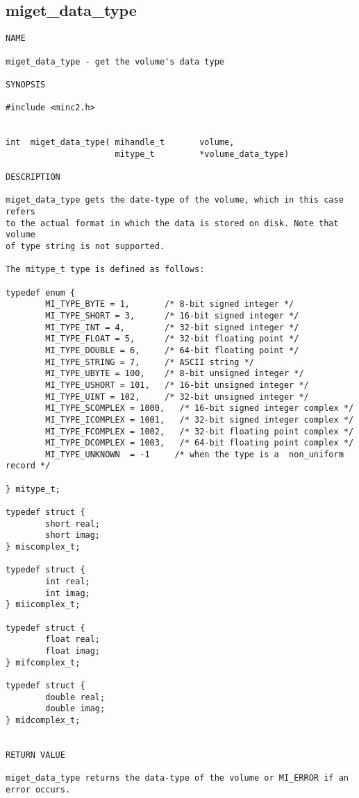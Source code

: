 \documentclass{article}
\begin{document}
\subsection{miget\_data\_type}
\begin{verbatim}
NAME

miget_data_type - get the volume's data type

SYNOPSIS

#include <minc2.h>


int  miget_data_type( mihandle_t       volume,
                      mitype_t         *volume_data_type)

DESCRIPTION

miget_data_type gets the date-type of the volume, which in this case refers
to the actual format in which the data is stored on disk. Note that volume
of type string is not supported.

The mitype_t type is defined as follows:

typedef enum {
        MI_TYPE_BYTE = 1,       /* 8-bit signed integer */
        MI_TYPE_SHORT = 3,      /* 16-bit signed integer */
        MI_TYPE_INT = 4,        /* 32-bit signed integer */
        MI_TYPE_FLOAT = 5,      /* 32-bit floating point */
        MI_TYPE_DOUBLE = 6,     /* 64-bit floating point */
        MI_TYPE_STRING = 7,     /* ASCII string */
        MI_TYPE_UBYTE = 100,    /* 8-bit unsigned integer */
        MI_TYPE_USHORT = 101,   /* 16-bit unsigned integer */
        MI_TYPE_UINT = 102,     /* 32-bit unsigned integer */
        MI_TYPE_SCOMPLEX = 1000,   /* 16-bit signed integer complex */
        MI_TYPE_ICOMPLEX = 1001,   /* 32-bit signed integer complex */
        MI_TYPE_FCOMPLEX = 1002,   /* 32-bit floating point complex */
        MI_TYPE_DCOMPLEX = 1003,   /* 64-bit floating point complex */
        MI_TYPE_UNKNOWN  = -1     /* when the type is a  non_uniform record */

} mitype_t;

typedef struct {
        short real;
        short imag;
} miscomplex_t;

typedef struct {
        int real;
        int imag;
} miicomplex_t;

typedef struct {
        float real;
        float imag;
} mifcomplex_t;

typedef struct {
        double real;
        double imag;
} midcomplex_t;


RETURN VALUE

miget_data_type returns the data-type of the volume or MI_ERROR if an
error occurs.
\end{verbatim}
\end{document}
